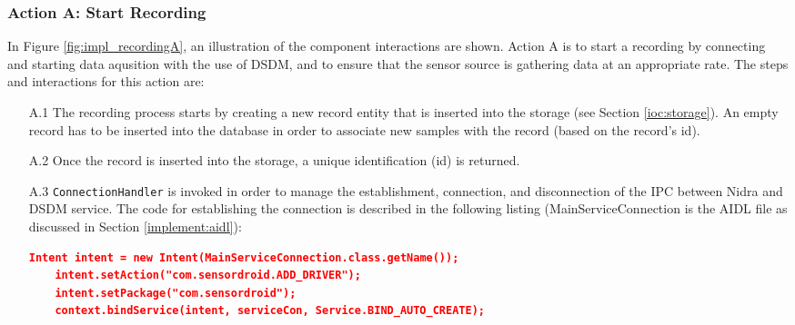 \subsubsection{Action A: Start Recording}

In Figure \ref{fig:impl_recordingA}, an illustration of the component interactions are shown. Action A is to start a recording by connecting and starting data aqusition with the use of DSDM, and to ensure that the sensor source is gathering data at an appropriate rate. The steps and interactions for this action are: 

\begin{itemize}
    \item[A.1] The recording process starts by creating a new record entity that is inserted into the storage (see Section \ref{ioc:storage}). An empty record has to be inserted into the database in order to associate new samples with the record (based on the record's id). 
    \item[A.2] Once the record is inserted into the storage, a unique identification (id) is returned. 
    \item[A.3] \verb|ConnectionHandler| is invoked in order to manage the establishment, connection, and disconnection of the IPC between Nidra and DSDM service. The code for establishing the connection is described in the following listing (MainServiceConnection is the AIDL file as discussed in Section \ref{implement:aidl}):
\begin{lstlisting}[language=json, caption={}, captionpos=b]
    Intent intent = new Intent(MainServiceConnection.class.getName());
    intent.setAction("com.sensordroid.ADD_DRIVER");
    intent.setPackage("com.sensordroid");
    context.bindService(intent, serviceCon, Service.BIND_AUTO_CREATE);
\end{lstlisting}
    

\end{itemize}
